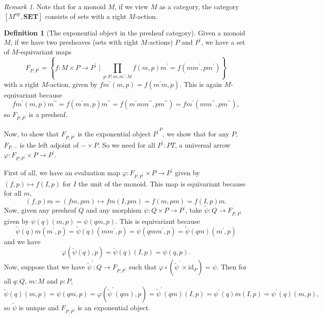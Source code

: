 \documentclass[a4paper]{amsbook}
\theoremstyle{definition}
\newtheorem{definition}{Definition}
\theoremstyle{remark}
\newtheorem{remark}{Remark}
\newcommand{\id}[1]{\ensuremath{\text{id}_{#1}}}
\newcommand{\op}[1]{\ensuremath{#1^{\text{op}}}}
\newcommand\SET{\mathbf{SET}}
\begin{document}
  \begin{remark}
    Note that for a monoid $ M $, if we view $ M $ as a category, the category $ [\op{M}, \SET] $ consists of sets with a right $ M $-action.
  \end{remark}

  \begin{definition}[The exponential object in the presheaf category]
    Given a monoid $ M $, if we have two presheaves (sets with right $ M $-actions) $ P $ and $ P^\prime $, we have a set of $ M $-equivariant maps
    \[ F_{P, P^\prime} = \left\{ f: M \times P \to P^\prime \mid \prod_{p : P, m, m^\prime: M} f(m, p)m^\prime = f(m m^\prime, p m^\prime) \right\} \]
    with a right $ M $-action, given by $ f m^\prime(m, p) = f(m^\prime m, p) $. This is again $ M $-equivariant because
    \[ fm^\prime(m, p)m^{\prime \prime} = f(m^\prime m, p)m^{\prime \prime} = f(m^\prime m m^{\prime \prime}, p m^{\prime \prime}) = f m^\prime(m m^{\prime \prime}, p m^{\prime \prime}), \]
    so $ F_{P, P^\prime} $ is a presheaf.

    Now, to show that $ F_{P, P^\prime} $ is the exponential object $ {P^\prime}^P $, we show that for any $ P $, $ F_{P, -} $ is the left adjoint of $ - \times P $. So we need for all $ P^\prime: PT $, a universal arrow $ \varphi: F_{P, P^\prime} \times P \to P^\prime $.

    First of all, we have an evaluation map $ \varphi: F_{P, P^\prime} \times P \to P^\prime $ given by $ (f, p) \mapsto f(I, p) $ for $ I $ the unit of the monoid. This map is equivariant because for all $ m $,
    \[ (f, p) m = (f m, p m) \mapsto f m(I, p m) = f(m, p m) = f(I, p) m. \]
    Now, given any presheaf $ Q $ and any morphism $ \psi: Q \times P \to P^\prime $, take $ \tilde \psi: Q \to F_{P, P^\prime} $ given by $ \psi(q)(m, p) = \psi(q m, p) $. This is equivariant because
    \[ \tilde \psi(q)m(m^\prime, p) = \tilde \psi(q)(m m^\prime, p) = \psi(q m m^\prime, p) = \tilde \psi(q m)(m^\prime, p) \]
    and we have
    \[ \varphi(\tilde \psi(q), p) = \tilde \psi(q)(I, p) = \psi(q, p). \]
    Now, suppose that we have $ \tilde \psi^\prime: Q \to F_{P, P^\prime} $ such that $ \varphi \circ (\tilde \psi^\prime \times \id{P}) = \psi $. Then for all $ q : Q $, $ m: M $ and $ p: P $,
    \[ \tilde \psi(q)(m, p) = \psi(q m, p) = \varphi(\tilde \psi^\prime(q m), p) = \tilde \psi^\prime(q m)(I, p) = \psi^\prime(q) m(I, p) = \psi^\prime(q)(m, p), \]
    so $ \tilde \psi $ is unique and $ F_{P, P^\prime} $ is an exponential object.
  \end{definition}
\end{document}
